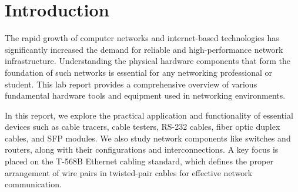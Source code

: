 \documentclass[12pt]{article}
\begin{document}
\tableofcontents
\thispagestyle{empty}
\clearpage
{}

\begin{abstract}
This lab report provides a comprehensive overview of essential computer networking hardware components and configurations encountered in practical networking environments. The main objective of this lab was to familiarize students with various networking tools and equipment such as cable testers, cable tracers, RS-232 cables, fiber optic duplex cables, SFP modules, and to understand the physical and logical aspects of network devices like switches and routers.\\
Through hands-on activities, we learned how to identify, test, and properly connect network cables using T-568B wiring standards, configure routers for Dynamic NAT and DHCP, and establish effective connections between switches and routers. The report also discusses the conceptual framework of the OSI Model to better understand the layer-wise interaction of network protocols and hardware.\\
By engaging in these exercises, students developed a strong foundational understanding of how computer networks are physically built and logically managed, which is crucial for further studies and careers in networking and IT infrastructure. The inclusion of real-world scenarios and step-by-step procedures reinforced the theoretical knowledge with practical implementation, bridging the gap between textbook learning and field expertise.\\
\end{abstract}


\section*{Introduction}
The rapid growth of computer networks and internet-based technologies has significantly increased the demand for reliable and high-performance network infrastructure. Understanding the physical hardware components that form the foundation of such networks is essential for any networking professional or student. This lab report provides a comprehensive overview of various fundamental hardware tools and equipment used in networking environments.

In this report, we explore the practical application and functionality of essential devices such as cable tracers, cable testers, RS-232 cables, fiber optic duplex cables, and SFP modules. We also study network components like switches and routers, along with their configurations and interconnections. A key focus is placed on the T-568B Ethernet cabling standard, which defines the proper arrangement of wire pairs in twisted-pair cables for effective network communication.
\end{document}
